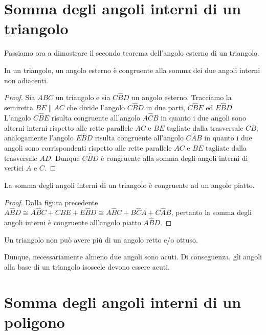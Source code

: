 \section{Somma degli angoli interni di un triangolo}\label{sect:angoli_interni_triangolo}

Passiamo ora a dimostrare il secondo teorema dell'angolo esterno di un triangolo.
\begin{teorema}
In un triangolo, un angolo esterno è congruente alla somma dei due angoli interni non adiacenti.
\end{teorema}

\begin{figure}[htb]
\centering
\end{figure}

\begin{proof}
Sia $ABC$ un triangolo e sia $C\widehat{B}D$ un angolo esterno. Tracciamo la semiretta $BE\parallel AC$ che divide l'angolo $C\widehat{B}D$ in due parti, $C\widehat{B}E$ ed $E\widehat{B}D$. L'angolo $C\widehat{B}E$ risulta congruente all'angolo $A\widehat{C}B$ in quanto i due angoli sono alterni interni rispetto alle rette parallele $AC$ e $BE$ tagliate dalla trasversale $CB$; analogamente l'angolo $E\widehat{B}D$ risulta congruente all'angolo $C\widehat{A}B$ in quanto i due angoli sono corrispondenti rispetto alle rette parallele $AC$ e $BE$ tagliate dalla trasversale $AD$. Dunque $C\widehat{B}D$ è congruente alla somma degli angoli interni di vertici $A$ e $C$.
\end{proof}

\begin{corollario}
La somma degli angoli interni di un triangolo è congruente ad un angolo piatto.
\end{corollario}
\begin{proof}
Dalla figura precedente $A\widehat{B}D\cong A\widehat{B}C + C\widehat{B}E + E\widehat{B}D\cong A\widehat{B}C + B\widehat{C}A + C\widehat{A}B$, pertanto la somma degli angoli interni è congruente all'angolo piatto $A\widehat{B}D$.
\end{proof}
\begin{corollario}
Un triangolo non può avere più di un angolo retto e/o ottuso.
\end{corollario}
Dunque, necessariamente almeno due angoli sono acuti. Di conseguenza, gli angoli alla base di un triangolo isoscele devono essere acuti.

\section{Somma degli angoli interni di un poligono}\label{sect:angoli_interni_poligono}

